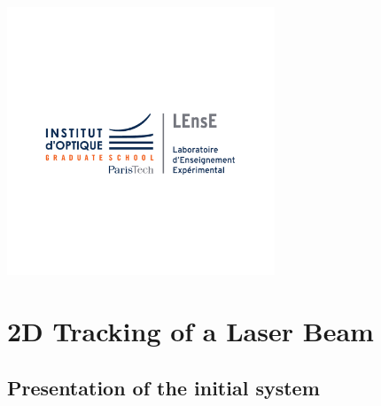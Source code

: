 \documentclass[14pt,fleqn]{book} %
\begin{document}
\begin{center}
	\includegraphics[width=8cm]{global_pictures/LEnsE_logo.pdf}
\end{center}




\pagestyle{empty} %

\tableofcontents %

\cleardoublepage %

\pagestyle{fancy} %


\part{2D Tracking of a Laser Beam}
\chapter{Presentation of the initial system}
\end{document}
